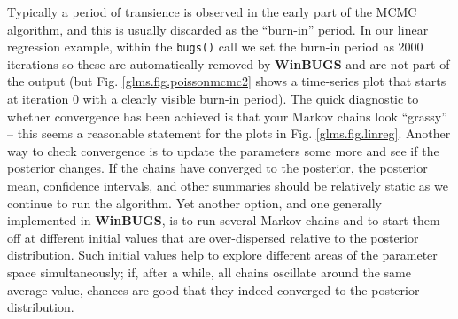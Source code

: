 Typically a period of transience is observed in the
early part of the MCMC algorithm, and this is usually discarded as the
``burn-in'' period. In our linear regression example, within the {\tt bugs()} call we set the burn-in period as 2000 iterations so these are automatically removed by {\bf WinBUGS} and are not part of the output (but Fig. \ref{glms.fig.poissonmcmc2} shows a time-series plot that starts at iteration 0 with a clearly visible burn-in period). The quick diagnostic to whether convergence has
been achieved is that your Markov chains look ``grassy'' -- this seems a reasonable statement for the plots in Fig. \ref{glms.fig.linreg}.  Another way to check convergence is to
update the parameters some more and see if the posterior changes. If
the chains have converged to the posterior, 
the posterior mean,
confidence intervals, and other summaries should be relatively static
as we continue to run the algorithm.  Yet
another option, and one generally implemented in {\bf WinBUGS}, is to
run several Markov chains and to start them off at different initial
values that are over-dispersed relative to the posterior
distribution. Such initial values help to explore different areas of
the parameter space simultaneously; if, after a while, all chains
oscillate around the same average value, chances are good that they
indeed converged to the posterior distribution.

